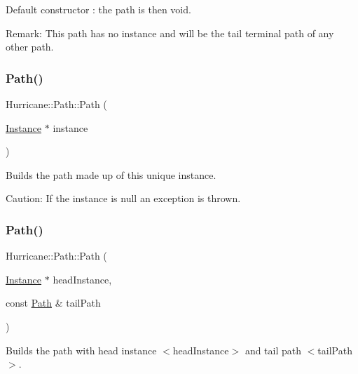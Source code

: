 Default constructor \+: the path is then void.

\begin{DoxyParagraph}{Remark\+:}
This path has no instance and will be the tail terminal path of any other path. 
\end{DoxyParagraph}
\mbox{\label{classHurricane_1_1Path_aa1a70f922b9b6a78fd3ac9b7bd94d158}} 
\subsubsection{\texorpdfstring{Path()}{Path()}\hspace{0.1cm}{\footnotesize\ttfamily [2/6]}}
{\footnotesize\ttfamily Hurricane\+::\+Path\+::\+Path (\begin{DoxyParamCaption}\item[{\hyperlink{classHurricane_1_1Instance}{Instance} $\ast$}]{instance }\end{DoxyParamCaption})}

Builds the path made up of this unique instance.

\begin{DoxyParagraph}{Caution\+:}
If the instance is null an exception is thrown. 
\end{DoxyParagraph}
\mbox{\label{classHurricane_1_1Path_a3197a114ed98117dde0f41d999917775}} 
\subsubsection{\texorpdfstring{Path()}{Path()}\hspace{0.1cm}{\footnotesize\ttfamily [3/6]}}
{\footnotesize\ttfamily Hurricane\+::\+Path\+::\+Path (\begin{DoxyParamCaption}\item[{\hyperlink{classHurricane_1_1Instance}{Instance} $\ast$}]{head\+Instance,  }\item[{const \hyperlink{classHurricane_1_1Path}{Path} \&}]{tail\+Path }\end{DoxyParamCaption})}

Builds the path with head instance {\ttfamily $<$head\+Instance$>$} and tail path {\ttfamily $<$tail\+Path$>$}.

